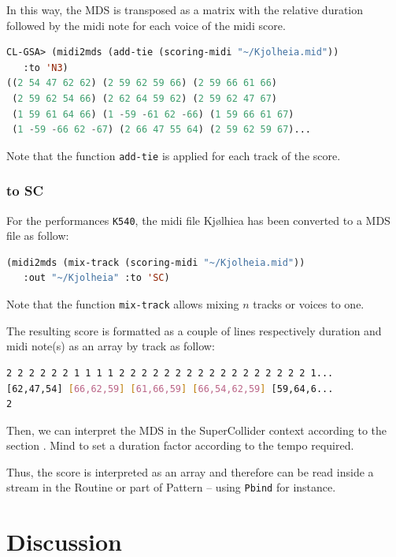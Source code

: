 \smallskip

In this way, the MDS is transposed as a matrix with the relative duration followed by the midi note for each voice of the midi score. 

\begin{lstlisting}[language=Lisp]
CL-GSA> (midi2mds (add-tie (scoring-midi "~/Kjolheia.mid")) 
   :to 'N3)
((2 54 47 62 62) (2 59 62 59 66) (2 59 66 61 66) 
 (2 59 62 54 66) (2 62 64 59 62) (2 59 62 47 67) 
 (1 59 61 64 66) (1 -59 -61 62 -66) (1 59 66 61 67) 
 (1 -59 -66 62 -67) (2 66 47 55 64) (2 59 62 59 67)...
\end{lstlisting}

Note that the function \texttt{add-tie} is applied for each track of the score.


\subsubsection{to SC}

For the performances \texttt{K540}, the midi file Kj{\o}lhiea has been converted to a MDS file as follow:
\begin{lstlisting}[language=Lisp]
(midi2mds (mix-track (scoring-midi "~/Kjolheia.mid")) 
   :out "~/Kjolheia" :to 'SC)
\end{lstlisting}

Note that the function \texttt{mix-track} allows mixing $n$ tracks or voices to one.
\newpage

The resulting score is formatted as a couple of lines respectively duration and midi note(s) as an array by track as follow:

\begin{lstlisting}[language=bash]
2 2 2 2 2 2 1 1 1 1 2 2 2 2 2 2 2 2 2 2 2 2 2 2 2 2 2 1...
[62,47,54] [66,62,59] [61,66,59] [66,54,62,59] [59,64,6...
2
\end{lstlisting}

\smallskip

Then, we can interpret the MDS in the SuperCollider context according to the section . Mind to set a duration factor according to the tempo required.

\smallskip

Thus, the score is interpreted as an array and therefore can be read inside a stream in the Routine or part of Pattern -- using \texttt{Pbind} for instance.


\section{Discussion}

